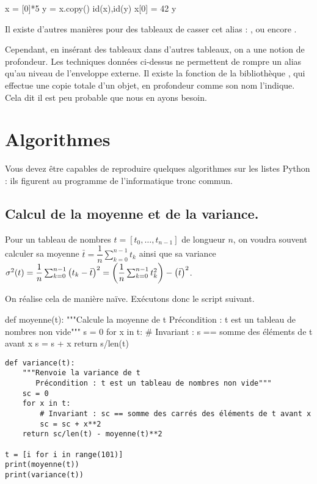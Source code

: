 \begin{pyconsole}
x = [0]*5
y = x.copy()
id(x),id(y)
x[0] = 42
y
\end{pyconsole}

Il existe d'autres manières pour des tableaux de casser cet alias : ,  ou encore .

Cependant, en insérant des tableaux dans d'autres tableaux, on a une notion de \og profondeur\fg. Les 
techniques données ci-dessus ne permettent de rompre un alias qu'au niveau de l'enveloppe externe. 
Il existe la fonction  de la bibliothèque , qui effectue une copie totale 
d'un objet, en profondeur comme son nom l'indique. Cela dit il est peu probable que nous en ayons 
besoin.

\section{Algorithmes}

Vous devez être capables de reproduire quelques algorithmes sur les listes Python : ils figurent 
au programme de l'informatique tronc commun.

\subsection{Calcul de la moyenne et de la variance.}
  Pour un tableau de nombres $t = [t_0,\dots,t_{n-1}]$ de longueur $n$, on voudra souvent calculer sa moyenne 
$   \bar{t} = \dfrac{1}{n} \sum_{k=0}^{n-1} t_k   $   ainsi que sa variance $
    \sigma^2(t) = \dfrac{1}{n} \sum_{k=0}^{n-1} \left( t_k - \bar{t}\right)^2 = \left( \dfrac{1}{n} \sum_{k=0}^{n-1} t_k^2\right) - \left( \bar{t}\right)^2$.
    
  On réalise cela de manière naïve. Exécutons donc le script suivant.



\begin{pyverbatim}
def moyenne(t):
    """Calcule la moyenne de t
       Précondition : t est un tableau de nombres non vide"""
    s = 0 
    for x in t:
        # Invariant : s == somme des éléments de t avant x
        s = s + x 
    return s/len(t)
\end{pyverbatim}

\begin{lstlisting}
def variance(t):
    """Renvoie la variance de t
       Précondition : t est un tableau de nombres non vide"""
    sc = 0
    for x in t:
        # Invariant : sc == somme des carrés des éléments de t avant x
        sc = sc + x**2 
    return sc/len(t) - moyenne(t)**2

t = [i for i in range(101)]
print(moyenne(t))
print(variance(t))
\end{lstlisting}


